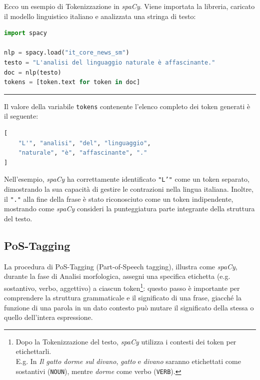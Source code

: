 \documentclass[12pt]{report}
\newcommand{\spacy}{\textsl{spaCy}\xspace}
\begin{document}
\begin{mdframed}
\small
Ecco un esempio di Tokenizzazione in \spacy. Viene importata la libreria, caricato il modello linguistico italiano e analizzata una stringa di testo:

\begin{lstlisting}[language=Python]
import spacy

nlp = spacy.load("it_core_news_sm")
testo = "L'analisi del linguaggio naturale è affascinante."
doc = nlp(testo)
tokens = [token.text for token in doc]
\end{lstlisting}

{\centering \rule{0.5\linewidth}{0.1pt} \par\vspace{0.25cm}}

\noindent Il valore della variabile \texttt{tokens} contenente l'elenco completo dei token generati è il seguente:

\begin{lstlisting}[language=Python]
[
    "L'", "analisi", "del", "linguaggio",
    "naturale", "è", "affascinante", "."
]
\end{lstlisting}
\end{mdframed}

\noindent Nell'esempio, \spacy ha correttamente identificato \texttt{"L'"} come un token separato, dimostrando la sua capacità di gestire le contrazioni nella lingua italiana. Inoltre, il \texttt{"."} alla fine della frase è stato riconosciuto come un token indipendente, mostrando come \spacy consideri la punteggiatura parte integrante della struttura del testo.


\subsection{PoS-Tagging}
La procedura di PoS-Tagging (Part-of-Speech tagging), illustra come \spacy, durante la fase di \textsf{Analisi morfologica}, assegni una specifica etichetta (e.g. sostantivo, verbo, aggettivo) a ciascun token\footnote{Dopo la Tokenizzazione del testo, \spacy utilizza i contesti dei token per etichettarli.\\
E.g. In \textit{Il gatto dorme sul divano}, \textit{gatto} e \textit{divano} saranno etichettati come sostantivi (\texttt{NOUN}), mentre \textit{dorme} come verbo (\texttt{VERB}).}: questo passo è importante per comprendere la struttura grammaticale e il significato di una frase, giacché la funzione di una parola in un dato contesto può mutare il significato della stessa o quello dell'intera espressione.
\end{document}
